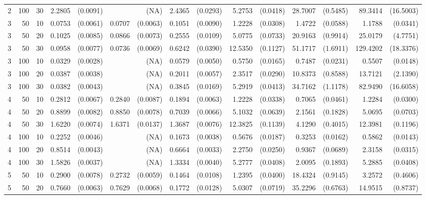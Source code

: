 \begin{table}[ht]
\begin{small}
\begin{tabular}{lrrrrrrrrrrrrrr}
  2 & 100 & 30 & 2.2805 & (0.0091) &  & (NA) & 2.4365 & (0.0293) & 5.2753 & (0.0418) & 28.7007 & (0.5485) & 89.3414 & (16.5003) \\ 
  3 & 50 & 10 & 0.0753 & (0.0061) & 0.0707 & (0.0063) & 0.1051 & (0.0090) & 1.2228 & (0.0308) & 1.4722 & (0.0588) & 1.1788 & (0.0341) \\ 
  3 & 50 & 20 & 0.1025 & (0.0085) & 0.0866 & (0.0073) & 0.2555 & (0.0109) & 5.0775 & (0.0733) & 20.9163 & (0.9914) & 25.0179 & (4.7751) \\ 
  3 & 50 & 30 & 0.0958 & (0.0077) & 0.0736 & (0.0069) & 0.6242 & (0.0390) & 12.5350 & (0.1127) & 51.1717 & (1.6911) & 129.4202 & (18.3376) \\ 
  3 & 100 & 10 & 0.0329 & (0.0028) &  & (NA) & 0.0579 & (0.0050) & 0.5750 & (0.0165) & 0.7487 & (0.0231) & 0.5507 & (0.0148) \\ 
  3 & 100 & 20 & 0.0387 & (0.0038) &  & (NA) & 0.2011 & (0.0057) & 2.3517 & (0.0290) & 10.8373 & (0.8588) & 13.7121 & (2.1390) \\ 
  3 & 100 & 30 & 0.0382 & (0.0043) &  & (NA) & 0.3845 & (0.0169) & 5.2919 & (0.0413) & 34.7162 & (1.1178) & 82.9490 & (16.6058) \\ 
  4 & 50 & 10 & 0.2812 & (0.0067) & 0.2840 & (0.0087) & 0.1894 & (0.0063) & 1.2228 & (0.0338) & 0.7065 & (0.0461) & 1.2284 & (0.0300) \\ 
  4 & 50 & 20 & 0.8899 & (0.0082) & 0.8850 & (0.0078) & 0.7039 & (0.0066) & 5.1032 & (0.0639) & 2.1561 & (0.1828) & 5.0695 & (0.0703) \\ 
  4 & 50 & 30 & 1.6220 & (0.0074) & 1.6371 & (0.0137) & 1.3687 & (0.0076) & 12.3825 & (0.1139) & 4.1290 & (0.4015) & 12.3981 & (0.1196) \\ 
  4 & 100 & 10 & 0.2252 & (0.0046) &  & (NA) & 0.1673 & (0.0038) & 0.5676 & (0.0187) & 0.3253 & (0.0162) & 0.5862 & (0.0143) \\ 
  4 & 100 & 20 & 0.8514 & (0.0043) &  & (NA) & 0.6664 & (0.0033) & 2.2750 & (0.0250) & 0.9367 & (0.0689) & 2.3158 & (0.0315) \\ 
  4 & 100 & 30 & 1.5826 & (0.0037) &  & (NA) & 1.3334 & (0.0040) & 5.2777 & (0.0408) & 2.0095 & (0.1893) & 5.2885 & (0.0408) \\ 
  5 & 50 & 10 & 0.2900 & (0.0078) & 0.2732 & (0.0059) & 0.1464 & (0.0108) & 1.2395 & (0.0400) & 18.4324 & (0.9145) & 3.2572 & (0.4606) \\ 
  5 & 50 & 20 & 0.7660 & (0.0063) & 0.7629 & (0.0068) & 0.1772 & (0.0128) & 5.0307 & (0.0719) & 35.2296 & (0.6763) & 14.9515 & (0.8737) \\ 

\end{tabular}
\end{small}
\end{table}
